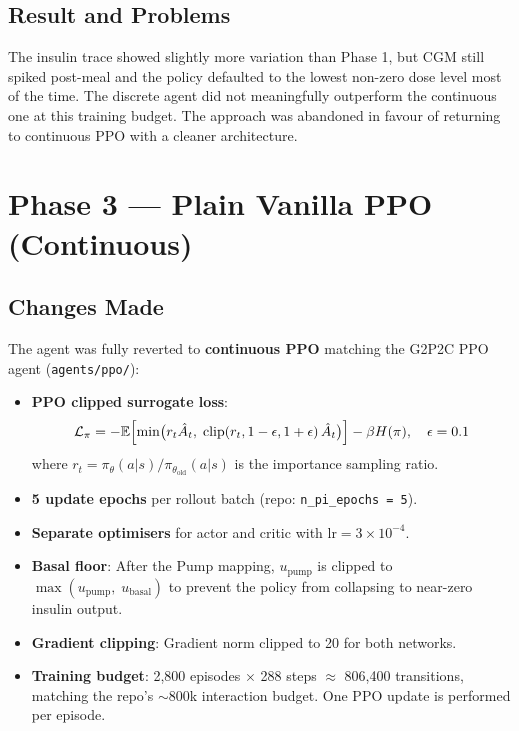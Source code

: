 \documentclass[11pt,a4paper]{article}
\begin{document}
\subsection{Result and Problems}
The insulin trace showed slightly more variation than Phase 1, but CGM still spiked
post-meal and the policy defaulted to the lowest non-zero dose level most of the time.
The discrete agent did not meaningfully outperform the continuous one at this training
budget. The approach was abandoned in favour of returning to continuous PPO with
a cleaner architecture.

\section{Phase 3 — Plain Vanilla PPO (Continuous)}

\subsection{Changes Made}
The agent was fully reverted to \textbf{continuous PPO} matching the G2P2C PPO agent
(\texttt{agents/ppo/}):

\begin{itemize}
    \item \textbf{PPO clipped surrogate loss}:
    \begin{equation}
        \mathcal{L}_\pi = -\mathbb{E}\Bigl[\min\bigl(r_t \hat{A}_t,\;
        \text{clip}(r_t, 1-\epsilon, 1+\epsilon)\,\hat{A}_t\bigr)\Bigr]
        - \beta H(\pi), \quad \epsilon = 0.1
    \end{equation}
    where $r_t = \pi_\theta(a|s) / \pi_{\theta_\text{old}}(a|s)$ is the importance
    sampling ratio.
    \item \textbf{5 update epochs} per rollout batch (repo: \texttt{n\_pi\_epochs = 5}).
    \item \textbf{Separate optimisers} for actor and critic with $\text{lr} = 3 \times 10^{-4}$.
    \item \textbf{Basal floor}: After the Pump mapping, $u_\text{pump}$ is clipped to
          $\max(u_\text{pump},\; u_\text{basal})$ to prevent the policy from collapsing to
          near-zero insulin output.
    \item \textbf{Gradient clipping}: Gradient norm clipped to 20 for both networks.
    \item \textbf{Training budget}: 2,800 episodes $\times$ 288 steps $\approx$ 806,400
          transitions, matching the repo's $\sim$800k interaction budget. One PPO update
          is performed per episode.
\end{itemize}
\end{document}
